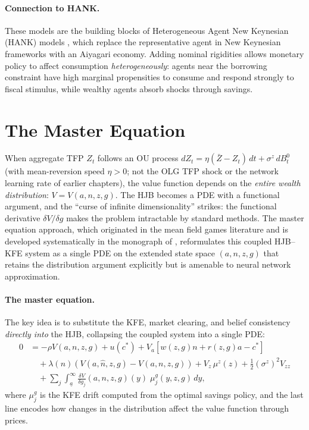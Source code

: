\documentclass[11pt,a4paper]{report}
\begin{document}
\paragraph{Connection to HANK.}  These models are the building blocks of Heterogeneous Agent New Keynesian (HANK) models \citep{kaplan2018monetary}, which replace the representative agent in New Keynesian frameworks with an Aiyagari economy.  Adding nominal rigidities allows monetary policy to affect consumption \emph{heterogeneously}: agents near the borrowing constraint have high marginal propensities to consume and respond strongly to fiscal stimulus, while wealthy agents absorb shocks through savings.

\section{The Master Equation}
\label{sec:master_eq}

When aggregate TFP $Z_t$ follows an OU process $dZ_t = \eta(\bar{Z} - Z_t)\,dt + \sigma^z\,dB_t^0$ (with mean-reversion speed $\eta>0$; not the OLG TFP shock or the network learning rate of earlier chapters), the value function depends on the \emph{entire wealth distribution}: $V = V(a, n, z, g)$.  The HJB becomes a PDE with a functional argument, and the ``curse of infinite dimensionality'' strikes: the functional derivative $\delta V/\delta g$ makes the problem intractable by standard methods.  The master equation approach, which originated in the mean field games literature \citep{lasry2007mean} and is developed systematically in the monograph of \citet{cardaliaguet2019master}, reformulates this coupled HJB--KFE system as a single PDE on the extended state space $(a, n, z, g)$ that retains the distribution argument explicitly but is amenable to neural network approximation.

\paragraph{The master equation.}  The key idea is to substitute the KFE, market clearing, and belief consistency \emph{directly into} the HJB, collapsing the coupled system into a single PDE:
\begin{equation}
\begin{split}
0 &= -\rho V(a,n,z,g) + u(c^*) + V_a\left[w(z,g)n + r(z,g)a - c^*\right] \\
&\quad + \lambda(n)\!\left(V(a,\hat{n},z,g) - V(a,n,z,g)\right) + V_z\,\mu^z(z) + \tfrac{1}{2}(\sigma^z)^2 V_{zz} \\
&\quad + \sum_{j} \int_{\underline{a}}^{\infty} \frac{\delta V}{\delta g_j}(a,n,z,g)(y)\;\mu^g_j(y,z,g)\,dy,
\end{split}
\label{eq:master_eq}
\end{equation}
where $\mu^g_j$ is the KFE drift computed from the optimal savings policy, and the last line encodes how changes in the distribution affect the value function through prices.
\end{document}
